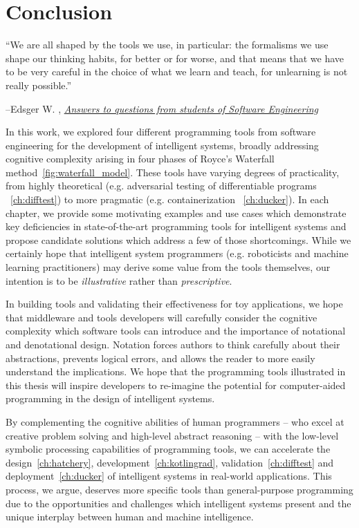 \chapter{Conclusion}\label{ch:conclusion}
\setlength{\epigraphwidth}{0.90\textwidth}
\epigraph{``We are all shaped by the tools we use, in particular: the formalisms we use shape our thinking habits, for better or for worse, and that means that we have to be very careful in the choice of what we learn and teach, for unlearning is not really possible.''}{\begin{flushright}--Edsger W. \citet{dijkstra2000answers}, \href{https://www.cs.utexas.edu/~EWD/transcriptions/EWD13xx/EWD1305.html}{\textit{Answers to questions from students of Software Engineering}}\end{flushright}}

In this work, we explored four different programming tools from software engineering for the development of intelligent systems, broadly addressing cognitive complexity arising in four phases of Royce's Waterfall method~\autoref{fig:waterfall_model}. These tools have varying degrees of practicality, from highly theoretical (e.g. adversarial testing of differentiable programs ~\autoref{ch:difftest}) to more pragmatic (e.g. containerization ~\autoref{ch:ducker}). In each chapter, we provide some motivating examples and use cases which demonstrate key deficiencies in state-of-the-art programming tools for intelligent systems and propose candidate solutions which address a few of those shortcomings. While we certainly hope that intelligent system programmers (e.g. roboticists and machine learning practitioners) may derive some value from the tools themselves, our intention is to be \textit{illustrative} rather than \textit{prescriptive}.

In building tools and validating their effectiveness for toy applications, we hope that middleware and tools developers will carefully consider the cognitive complexity which software tools can introduce and the importance of notational and denotational design. Notation forces authors to think carefully about their abstractions, prevents logical errors, and allows the reader to more easily understand the implications. We hope that the programming tools illustrated in this thesis will inspire developers to re-imagine the potential for computer-aided programming in the design of intelligent systems.

By complementing the cognitive abilities of human programmers -- who excel at creative problem solving and high-level abstract reasoning -- with the low-level symbolic processing capabilities of programming tools, we can accelerate the design~\autoref{ch:hatchery}, development~\autoref{ch:kotlingrad}, validation~\autoref{ch:difftest} and deployment~\autoref{ch:ducker} of intelligent systems in real-world applications. This process, we argue, deserves more specific tools than general-purpose programming due to the opportunities and challenges which intelligent systems present and the unique interplay between human and machine intelligence.

